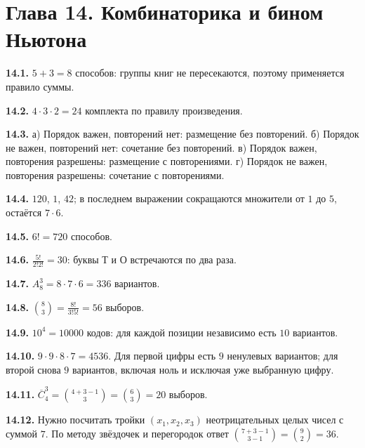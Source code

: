 \documentclass[12pt,a4paper,oneside,openany]{book}
\theoremstyle{colordef}\newtheorem{definition}{Определение}[chapter]
\theoremstyle{plain}\newtheorem{theorem}{Теорема}[chapter]
\theoremstyle{definition}\newtheorem{axiom}{Аксиома}[chapter]
\begin{document}
\section*{Глава 14. Комбинаторика и бином Ньютона}
\begingroup\setlength{\parskip}{3pt}
\textbf{14.1.} \(5+3=8\) способов: группы книг не пересекаются, поэтому применяется правило суммы.\par
\textbf{14.2.} \(4\cdot3\cdot2=24\) комплекта по правилу произведения.\par
\textbf{14.3.} а) Порядок важен, повторений нет: размещение без повторений. б) Порядок не важен, повторений нет: сочетание без повторений. в) Порядок важен, повторения разрешены: размещение с повторениями. г) Порядок не важен, повторения разрешены: сочетание с повторениями.\par
\textbf{14.4.} \(120\), \(1\), \(42\); в последнем выражении сокращаются множители от \(1\) до \(5\), остаётся \(7\cdot6\).\par
\textbf{14.5.} \(6!=720\) способов.\par
\textbf{14.6.} \(\frac{5!}{2!2!}=30\): буквы Т и О встречаются по два раза.\par
\textbf{14.7.} \(A_8^3=8\cdot7\cdot6=336\) вариантов.\par
\textbf{14.8.} \(\binom83=\frac{8!}{3!5!}=56\) выборов.\par
\textbf{14.9.} \(10^4=10000\) кодов: для каждой позиции независимо есть \(10\) вариантов.\par
\textbf{14.10.} \(9\cdot9\cdot8\cdot7=4536\). Для первой цифры есть \(9\) ненулевых вариантов; для второй снова \(9\) вариантов, включая ноль и исключая уже выбранную цифру.\par
\textbf{14.11.} \(\overline C_4^3=\binom{4+3-1}{3}=\binom63=20\) выборов.\par
\textbf{14.12.} Нужно посчитать тройки \((x_1,x_2,x_3)\) неотрицательных целых чисел с суммой \(7\). По методу звёздочек и перегородок ответ \(\binom{7+3-1}{3-1}=\binom92=36\).\par
\end{document}

